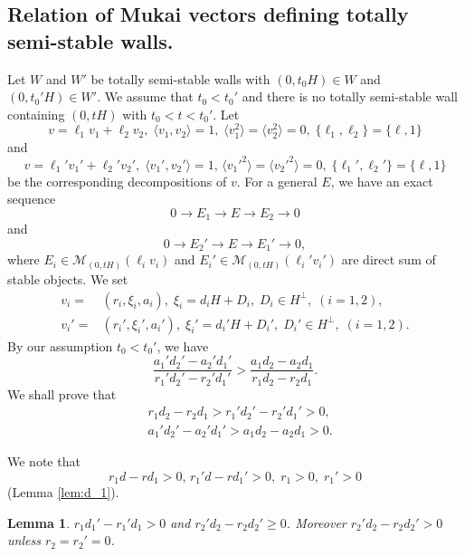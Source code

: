 \documentclass[10pt]{amsart}
\def\cal{\mathcal}
\numberwithin{equation}{section}
\theoremstyle{plain}
\newtheorem{lem}[thm]{Lemma}
\theoremstyle{definition}
\theoremstyle{remark}
\begin{document}
\subsection{Relation of Mukai vectors defining totally semi-stable walls.}

Let $W$ and $W'$ be totally semi-stable walls with $(0,t_0 H) \in W$ and
$(0,t_0' H) \in W'$.
We assume that $t_0<t_0'$ and
there is no totally semi-stable wall containing $(0,tH)$ with $t_0<t<t_0'$.
Let 
\begin{equation}
v=\ell_1 v_1+\ell_2 v_2,\;\langle v_1,v_2 \rangle=1,\; \langle v_1^2 \rangle=\langle v_2^2 \rangle=0,\;
 \{\ell_1,\ell_2 \}=\{ \ell,1 \}
\end{equation}
and
\begin{equation}
v=\ell_1 ' v_1'+\ell_2' v_2',\;
\langle v_1',v_2' \rangle=1,\, \langle {v_1'}^2 \rangle=\langle {v_2'}^2 \rangle=0,\;
 \{\ell_1',\ell_2' \}=\{ \ell,1 \}
\end{equation}
be the corresponding decompositions of $v$. 
For a general $E$, we have an exact sequence
$$
0 \to E_1 \to E \to E_2 \to 0
$$
and
$$
0 \to E_2' \to E \to E_1' \to 0,
$$
where $E_i \in {\cal M}_{(0,tH)}(\ell_i v_i)$
and $E_i' \in {\cal M}_{(0,tH)}(\ell_i' v_i')$
are direct sum of stable objects.
We set 
\begin{equation}
\begin{split}
v_i=& (r_i,\xi_i,a_i),\; \xi_i=d_i H+D_i,\; D_i \in H^\perp, \; (i=1,2),\\
v_i'=& (r_i',\xi_i',a_i'),\; \xi_i'=d_i' H+D_i',\; D_i' \in H^\perp, \; (i=1,2).
\end{split}
\end{equation}
%
By our assumption $t_0<t_0'$, we have
$$
\frac{a_1' d_2'-a_2' d_1'}{r_1' d_2'-r_2' d_1'}>\frac{a_1 d_2-a_2 d_1}{r_1 d_2-r_2 d_1}.
$$
We shall prove that
\begin{equation}
\begin{split}
& r_1d_2-r_2 d_1>  r_1' d_2'-r_2' d_1'>0,\\
& a_1' d_2'-a_2' d_1' >  a_1 d_2-a_2 d_1>0.
\end{split}
\end{equation}


We note that 
$$
r_1 d-r d_1>0,\, r_1' d-r d_1'>0,\;
r_1>0,\;r_1'>0
$$
(Lemma \ref{lem:d_1}).

\begin{lem}\label{lem:dd'}
$r_1 d_1'-r_1' d_1>0$ and $r_2' d_2-r_2 d_2' \geq 0$.
Moreover $r_2' d_2-r_2 d_2' > 0$ unless $r_2=r_2'=0$.
\end{lem}
\end{document}
